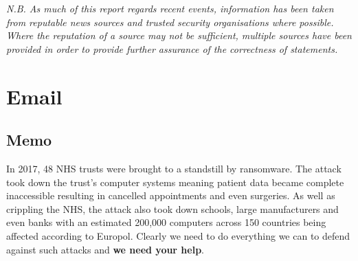 \documentclass{article}
\begin{document}
\textit{N.B. As much of this report regards recent events, information has been taken from reputable news sources and trusted security organisations where possible.
Where the reputation of a source may not be sufficient, multiple sources have been provided in order to provide further assurance of the correctness of statements.}

\newpage
\section{Email}
\subsection{Memo}%

In 2017, 48 NHS trusts were brought to a standstill by ransomware. The attack took down the trust's computer systems meaning patient data became complete inaccessible resulting in cancelled appointments and even surgeries\cite{wannacry_bbc}. As well as crippling the NHS, the attack also took down schools, large manufacturers and even banks with an estimated 200,000 computers across 150 countries being affected according to Europol\cite{wannacry_reuters}. Clearly we need to do everything we can to defend against such attacks and \textbf{we need your help}.
\end{document}
